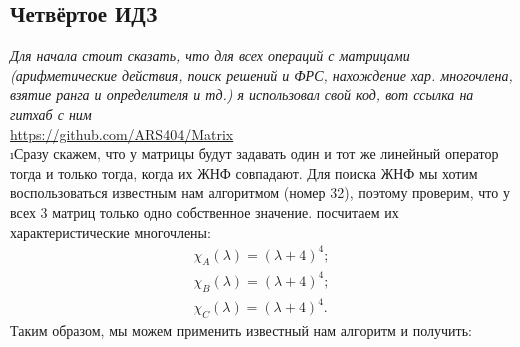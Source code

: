\subsection{Четвёртое ИДЗ}

\textit{Для начала стоит сказать, что для всех операций с матрицами (арифметические действия, поиск решений и ФРС, нахождение хар. многочлена, взятие ранга и определителя и тд.) я использовал свой код, вот ссылка на гитхаб с ним}\\
\url{https://github.com/ARS404/Matrix}
\\

\i Сразу скажем, что у матрицы будут задавать один и тот же линейный оператор тогда и только тогда, когда их ЖНФ совпадают. Для поиска ЖНФ мы хотим воспользоваться известным нам алгоритмом (номер 32), поэтому проверим, что у всех 3 матриц только одно собственное значение. посчитаем их характеристические многочлены:
\begin{gather*}
    \chi_A(\lambda) = (\lambda + 4)^4;\\
    \chi_B(\lambda) = (\lambda + 4)^4;\\
    \chi_C(\lambda) = (\lambda + 4)^4.
\end{gather*}
Таким образом, мы можем применить известный нам алгоритм и получить:
